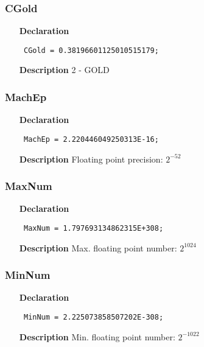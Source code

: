 \documentclass[12pt,a4paper,oneside]{report}
\newcommand{\declarationitem}[1]{\textbf{#1}}
\newcommand{\descriptiontitle}[1]{\textbf{#1}}
\newcommand{\code}[1]{\texttt{#1}}
\begin{document}
\subsubsection{CGold}
\label{utypes-CGold}
\begin{itemize}\item[\declarationitem{Declaration}\hfill]
	\begin{flushleft}
		\code{
			CGold      = 0.38196601125010515179;}
		
	\end{flushleft}
	
	\par
	\item[\descriptiontitle{Description}]
	2 {-} GOLD
	
\end{itemize}
\subsubsection{MachEp}
\label{utypes-MachEp}
\begin{itemize}\item[\declarationitem{Declaration}\hfill]
	\begin{flushleft}
		\code{
			MachEp   = 2.220446049250313E-16;}
	\end{flushleft}
	\par
	\item[\descriptiontitle{Description}]
	Floating point precision: $2^{-52}$
\end{itemize}
\subsubsection{MaxNum}
\label{utypes-MaxNum}
\begin{itemize}\item[\declarationitem{Declaration}\hfill]
	\begin{flushleft}
		\code{
			MaxNum   = 1.797693134862315E+308;}
		
	\end{flushleft}
	
	\par
	\item[\descriptiontitle{Description}]
	Max. floating point number: $2^{1024}$
	
\end{itemize}
\subsubsection{MinNum}
\label{utypes-MinNum}
\begin{itemize}\item[\declarationitem{Declaration}\hfill]
	\begin{flushleft}
		\code{
			MinNum   = 2.225073858507202E-308;}
		
	\end{flushleft}
	
	\par
	\item[\descriptiontitle{Description}]
	Min. floating point number: $2^{-1022}$
	
\end{itemize}
\end{document}
